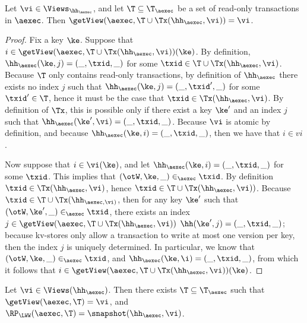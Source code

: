\begin{proposition}
\label{prop:getview.tx}
Let $\vi \in \Views_{\hh_{\aexec}}$, and let $\T \subseteq \T_{\aexec}$ be a 
set of read-only transactions in $\aexec$. Then 
$\getView(\aexec, \T \cup \Tx(\hh_{\aexec}, \vi)) = \vi$. 
\end{proposition}

\begin{proof}
Fix a key $\ke$. Suppose that $i \in \getView(\aexec, \T \cup \Tx(\hh_{\aexec}, \vi))(\ke)$. 
By definition, $\hh_{\aexec}(\ke, j) = (\_, \txid, \_)$ for some $\txid \in \T \cup \Tx(\hh_{\aexec}, \vi)$. 
Because $\T$ only contains read-only transactions, by definition of $\hh_{\aexec}$ there exists 
no index $j$ such that $\hh_{\aexec}(\ke, j) = (\_, \txid', \_)$ for some $\txid' \in \T$, 
hence it must be the case that $\txid \in \Tx(\hh_{\aexec}, \vi)$. By definition of $\Tx$, 
this is possible only if there exist a key $\ke'$ and an index $j$ such that $\hh_{\aexec}(\ke', \vi) = (\_, \txid, \_)$. 
Because $\vi$ is atomic by definition, and because $\hh_{\aexec}(\ke, i) = (\_, \txid, \_)$, then we have that $i \in vi$. 

Now suppose that $i \in \vi(\ke)$, and let $\hh_{\aexec}(\ke, i) = (\_, \txid, \_)$ for some $\txid$. 
This implies that $(\otW, \ke, \_) \in_{\aexec} \txid$.
By definition $\txid \in \Tx(\hh_{\aexec}, \vi)$, hence $\txid \in \T \cup \Tx(\hh_{\aexec}, \vi))$. 
Because $\txid \in \T \cup \Tx(\hh_{\aexec, \vi)}$, then for any key $\ke'$ such that 
$(\otW, \ke', \_) \in_{\aexec} \txid$, there exists an index $j \in \getView(\aexec, \T \cup \Tx(\hh_{\aexec}, \vi))$ 
$\hh(\ke', j) = (\_, \txid, \_)$; because kv-stores only allow a transaction to write at most one version 
per key, then the index $j$ is uniquely determined. In particular, we know that $(\otW, \ke, \_) \in_{\aexec} \txid$, 
and $\hh_{\aexec}(\ke, \i) = (\_, \txid, \_)$, from which it follows that $i \in \getView(\aexec, \T \cup \Tx(\hh_{\aexec}, \vi))(\ke)$.
\end{proof}

\begin{proposition}
\label{prop:compatible.kv2aexec}
Let $\vi \in \Views(\hh_{\aexec})$. Then there exists $\T \subseteq \T_{\aexec}$ 
such that $\getView(\aexec, \T) = \vi$, and $\RP_{\LWW}(\aexec, \T) = \snapshot(\hh_{\aexec}, \vi)$.
\end{proposition}

